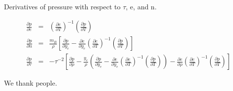 \documentclass[onecolumn]{aastex62}
\begin{document}
Derivatives of pressure with respect to $\tau$, e, and n. \\
\begin{footnotesize}
\begin{eqnarray}
	\frac{\partial{p}}{\partial{e}} &=& \left(\frac{\partial{e}}{\partial{T}}\right)^{-1}\left(\frac{\partial{p}}{\partial{T}}\right) \\
	\frac{\partial{p}}{\partial{n}} &=& \frac{m_B}{\rho} \left[ \frac{\partial{p}}{\partial{y_e}} -
          \frac{\partial{e}}{\partial{y_e}}\left(\frac{\partial{e}}{\partial{T}}\right)^{-1}\left(\frac{\partial{p}}{\partial{T}}\right)\right]\\
	\frac{\partial{p}}{\partial{\tau}} &=& -\tau^{-2} \left[ \frac{\partial{p}}{\partial{\rho}} - \frac{y_e}{\rho} \left( \frac{\partial{p}}{\partial{y_e}} -
          \frac{\partial{e}}{\partial{y_e}} \left(\frac{\partial{e}}{\partial{T}}\right)^{-1}\left(\frac{\partial{p}}{\partial{T}}\right)\right) -
          \frac{\partial{e}}{\partial{\rho}}\left(\frac{\partial{e}}{\partial{T}}\right)^{-1}\left(\frac{\partial{p}}{\partial{T}}\right)\right]
\end{eqnarray}
\end{footnotesize}

\acknowledgements
We thank people.


\end{document}
